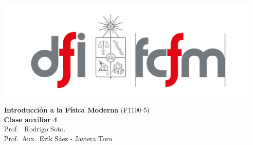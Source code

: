 \documentclass[
  11pt,
  letterpaper,
   addpoints,
   answers
  ]{exam}
\begin{document}
\pagestyle{headandfoot}

\noindent
\begin{minipage}{0.47\textwidth}
\includegraphics[width=\textwidth]{../fcfm_die.png}
\end{minipage}
\begin{minipage}{0.53\textwidth}
\begin{center} 
\large\textbf{Introducción a la Física Moderna} (F1100-5) \\
\large\textbf{Clase auxiliar 4} \\
\normalsize Prof.~ Rodrigo Soto.\\
\normalsize Prof.~Aux.~Erik Sáez - Javiera Toro 
\end{center}
\end{minipage}

\vspace{0.5cm}
\noindent
\vspace{.85cm}
\end{document}

